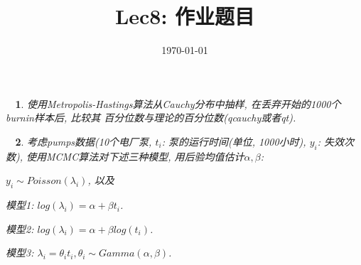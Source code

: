 \documentclass[10pt,CCT]{ctexart}
\newtheorem{prob}{~}
\begin{document}
%

\title{Lec8: 作业题目}
 \date{\today}%

\maketitle
\thispagestyle{empty}
\begin{prob}\rm
使用Metropolis-Hastings算法从Cauchy分布中抽样, 在丢弃开始的1000个burnin样本后, 比较其
百分位数与理论的百分位数(qcauchy或者qt).
\end{prob}

\begin{prob}\rm
考虑\emph{pumps}数据(10个电厂泵, $t_i$: 泵的运行时间(单位, 1000小时), $y_i$: 失效次数), 
使用MCMC算法对下述三种模型, 用后验均值估计$\alpha,\beta$:


$y_i\sim Poisson(\lambda_i)$, 以及

模型1: $log(\lambda_i)=\alpha+\beta t_i$.

模型2: $log(\lambda_i)=\alpha+\beta log(t_i)$.

模型3: $\lambda_i=\theta_it_i, \theta_i\sim Gamma(\alpha,\beta)$.

\end{prob}
\end{document}
